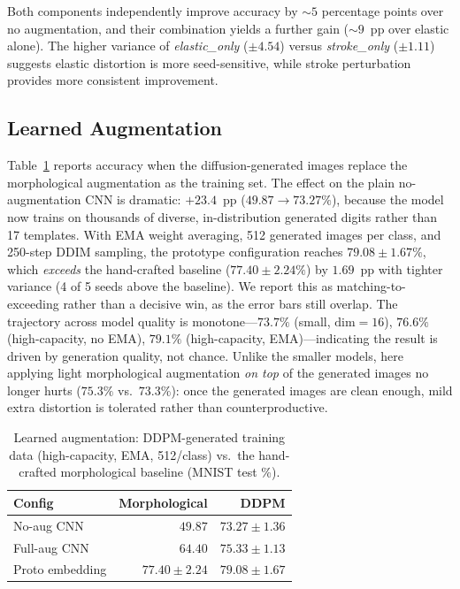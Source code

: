 \documentclass[final,5p,times,twocolumn]{elsarticle}
\begin{document}
Both components independently improve accuracy by $\sim\!5$ percentage points over no
augmentation, and their combination yields a further gain (${\sim}9$~pp over elastic alone).
The higher variance of \textit{elastic\_only} ($\pm4.54$) versus \textit{stroke\_only}
($\pm1.11$) suggests elastic distortion is more seed-sensitive, while stroke perturbation
provides more consistent improvement.

\subsection{Learned Augmentation}
\label{sec:diffusion-results}

Table~\ref{tab:diffusion} reports accuracy when the diffusion-generated images replace the
morphological augmentation as the training set.
The effect on the plain no-augmentation CNN is dramatic: $+23.4$~pp ($49.87\to73.27\%$),
because the model now trains on thousands of diverse, in-distribution generated digits
rather than 17 templates.
With EMA weight averaging, 512 generated images per class, and 250-step DDIM sampling, the
prototype configuration reaches $79.08 \pm 1.67\%$, which \emph{exceeds} the hand-crafted
baseline ($77.40 \pm 2.24\%$) by $1.69$~pp with tighter variance (4 of 5 seeds above the
baseline). We report this as matching-to-exceeding rather than a decisive win, as the error
bars still overlap. The trajectory across model quality is monotone—$73.7\%$ (small,
$\text{dim}=16$), $76.6\%$ (high-capacity, no EMA), $79.1\%$ (high-capacity, EMA)—indicating
the result is driven by generation quality, not chance.
Unlike the smaller models, here applying light morphological augmentation \emph{on top} of
the generated images no longer hurts ($75.3\%$ vs.\ $73.3\%$): once the generated images are
clean enough, mild extra distortion is tolerated rather than counterproductive.

\begin{table}[t]
  \caption{Learned augmentation: DDPM-generated training data (high-capacity, EMA,
           512/class) vs.\ the hand-crafted morphological baseline (MNIST test \%).}
  \label{tab:diffusion}
  \centering
  \begin{tabular}{@{}lrr@{}}
    \toprule
    Config & Morphological & DDPM \\
    \midrule
    No-aug CNN       & $49.87$ & $73.27 \pm 1.36$ \\
    Full-aug CNN     & $64.40$ & $75.33 \pm 1.13$ \\
    Proto embedding  & $77.40 \pm 2.24$ & $\mathbf{79.08 \pm 1.67}$ \\
    \bottomrule
  \end{tabular}
\end{table}
\end{document}
